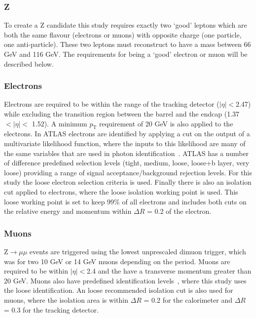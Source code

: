 \subsubsection{Z}
To create a Z candidate this study requires exactly two `good' leptons which are both the same flavour (electrons or muons) with opposite charge (one particle, one anti-particle). 
These two leptons must reconstruct to have a mass between 66 GeV and 116 GeV.  
The requirements for being a `good' electron or muon will be described below.  

\subsubsection{Electrons}
Electrons are required to be within the range of the tracking detector ($\mid\eta\mid<$2.47) while excluding the transition region between the barrel and the endcap (1.37 $<\mid\eta\mid<$ 1.52).  
A minimum $p_{\mathrm T}$ requirement of 20 GeV is also applied to the electrons.  
In ATLAS electrons are identified by applying a cut on the output of a multivariate likelihood function, where the inputs to this likelihood are many of the same variables that are used in photon identification~\cite{ATL-PHYS-PUB-2015-041}.  
ATLAS has a number of difference predefined selection levels (tight, medium, loose, loose+b layer, very loose) providing a range of signal acceptance/background rejection levels.  
For this study the loose electron selection criteria is used.  
Finally there is also an isolation cut applied to electrons, where the loose isolation working point is used.  
This loose working point is set to keep 99\% of all electrons and includes both cuts on the relative energy and momentum within $\Delta R$ = 0.2 of the electron.  


\subsubsection{Muons}
Z$\rightarrow\mu\mu$ events are triggered using the lowest unprescaled dimuon trigger, which was for two 10 GeV or 14 GeV muons depending on the period.   
Muons are required to be within $\mid\eta\mid<$2.4 and the have a transverse momentum greater than 20 GeV.  
Muons also have predefined identification levels~\cite{ATL-PHYS-PUB-2015-037}, where this study uses the loose identification.  
An loose recommended isolation cut is also used for muons, where the isolation area is within $\Delta R$ = 0.2 for the calorimeter and $\Delta R$ = 0.3 for the tracking detector.  

